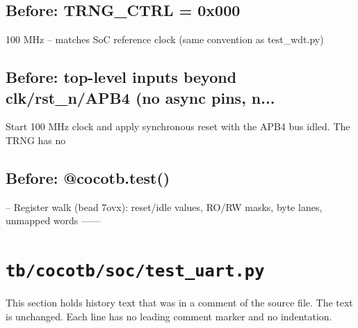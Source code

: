 \begin{record}

\subsection*{Before: TRNG\_CTRL = 0x000}

\begin{textblock}
100 MHz -- matches SoC reference clock (same convention as test_wdt.py)
\end{textblock}

\subsection*{Before: top-level inputs beyond clk/rst\_n/APB4 (no async pins, n...}

\begin{textblock}
Start 100 MHz clock and apply synchronous reset with the APB4 bus idled. The TRNG has no
\end{textblock}

\subsection*{Before: @cocotb.test()}

\begin{textblock}
-- Register walk (bead 7ovx): reset/idle values, RO/RW masks, byte lanes, unmapped words ------
\end{textblock}

\end{record}

\section{\texttt{tb/cocotb/soc/test\_uart.py}}\label{cr:suite:soc-test-uart}

This section holds history text that was in a comment of the source file. The text is unchanged. Each line has no leading comment marker and no indentation.

